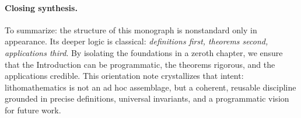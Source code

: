 \paragraph{Closing synthesis.}
To summarize: the structure of this monograph is nonstandard 
only in appearance. 
Its deeper logic is classical: \emph{definitions first, theorems second, 
applications third}. 
By isolating the foundations in a zeroth chapter, 
we ensure that the Introduction can be programmatic, 
the theorems rigorous, 
and the applications credible. 
This orientation note crystallizes that intent: 
lithomathematics is not an ad hoc assemblage, 
but a coherent, reusable discipline grounded in precise definitions, 
universal invariants, and a programmatic vision for future work. 

